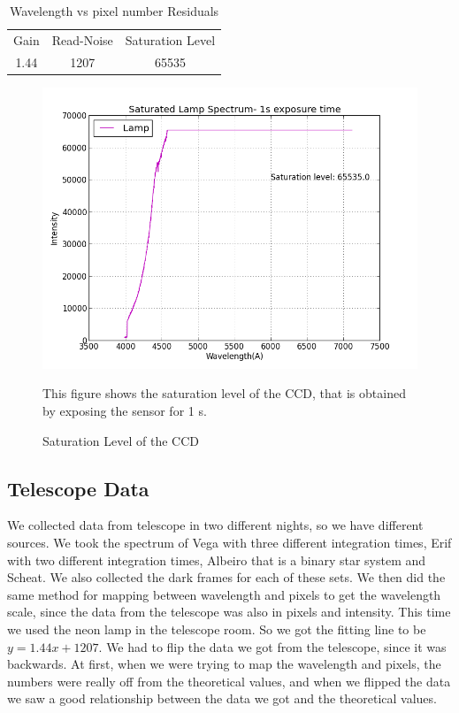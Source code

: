 \documentclass[letterpaper,12pt]{article}
\begin{document}
\FloatBarrier
\begin{table}
\caption{Wavelength vs pixel number Residuals} %
\centering %
\begin{tabular}{c c c} %
\hline%
Gain & Read-Noise & Saturation Level\\ [0.5ex] %
1.44 & 1207 & 65535\\ [1ex] %
\hline %
\end{tabular}
\label{table:nonlin} %
\end{table}
\FloatBarrier


\begin{figure}[t!]
\centering
\includegraphics[scale=0.5]{saturation_level.png}
\caption{Saturation Level of the CCD }
This figure shows the saturation level of the CCD, that is obtained by exposing the sensor for 1 s.
\end{figure}



\subsection{Telescope Data}
We collected data from telescope in two different nights, so we have different sources. We took the spectrum of Vega with three different integration times, Erif with two different integration times, Albeiro that is a binary star system and Scheat. We also collected the dark frames for each of these sets. We then did the same method for mapping between wavelength and pixels to get the wavelength scale, since the data from the telescope was also in pixels and intensity. This time we used the neon lamp in the telescope room. So we got the fitting line to be \begin{math} y= 1.44 x +1207 \end{math}.
We had to flip the data we got from the telescope, since it was backwards. At first, when we were trying to map the wavelength and pixels, the numbers were really off from the theoretical values, and when we flipped the data we saw a good relationship between the data we got and the theoretical values.
\end{document}
